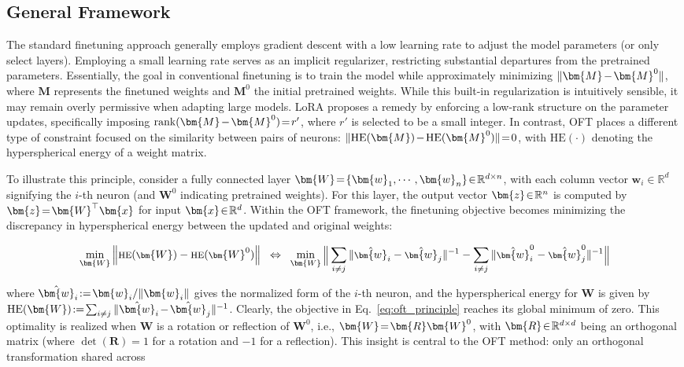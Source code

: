 \subsection{General Framework}

The standard finetuning approach generally employs gradient descent with a low learning rate to adjust the model parameters (or only select layers). Employing a small learning rate serves as an implicit regularizer, restricting substantial departures from the pretrained parameters. Essentially, the goal in conventional finetuning is to train the model while approximately minimizing $\thickmuskip=2mu \medmuskip=2mu \| \bm{M} - \bm{M}^0\|$, where $\bm{M}$ represents the finetuned weights and $\bm{M}^0$ the initial pretrained weights. While this built-in regularization is intuitively sensible, it may remain overly permissive when adapting large models. LoRA proposes a remedy by enforcing a low-rank structure on the parameter updates, specifically imposing $\thickmuskip=2mu \medmuskip=2mu \text{rank}(\bm{M} - \bm{M}^0)=r'$, where $r'$ is selected to be a small integer. In contrast, OFT places a different type of constraint focused on the similarity between pairs of neurons: $\thickmuskip=2mu \medmuskip=2mu \| \text{HE}(\bm{M})-\text{HE}(\bm{M}^0) \|=0$, with $\text{HE}(\cdot)$ denoting the hyperspherical energy of a weight matrix.

To illustrate this principle, consider a fully connected layer $\thickmuskip=2mu \medmuskip=2mu \bm{W}=\{\bm{w}_1,\cdots,\bm{w}_n\}\in\mathbb{R}^{d\times n}$, with each column vector $\bm{w}_i\in\mathbb{R}^{d}$ signifying the $i$-th neuron (and $\bm{W}^0$ indicating pretrained weights). For this layer, the output vector $\thickmuskip=2mu \medmuskip=2mu \bm{z}\in\mathbb{R}^n$ is computed by $\thickmuskip=2mu \medmuskip=2mu \bm{z}=\bm{W}^\top\bm{x}$ for input $\thickmuskip=2mu \medmuskip=2mu \bm{x}\in\mathbb{R}^d$. Within the OFT framework, the finetuning objective becomes minimizing the discrepancy in hyperspherical energy between the updated and original weights:

\begin{equation}\label{eq:oft_principle}
\footnotesize
\min_{\bm{W}} \left\| \text{HE}(\bm{W})-\text{HE}(\bm{W}^0)\right\|~~\Leftrightarrow~~\min_{\bm{W}} \bigg{\|} \sum_{i\neq j} \|\hat{\bm{w}}_i-\hat{\bm{w}}_j\|^{-1}-\sum_{i\neq j} \|\hat{\bm{w}}^0_i-\hat{\bm{w}}^0_j\|^{-1}\bigg{\|}
\end{equation}

where $\thickmuskip=2mu \medmuskip=2mu \hat{\bm{w}}_i:=\bm{w}_i/\|\bm{w}_i\|$ gives the normalized form of the $i$-th neuron, and the hyperspherical energy for $\bm{W}$ is given by $\thickmuskip=2mu \medmuskip=2mu \text{HE}(\bm{W}):= \sum_{i\neq j} \|\hat{\bm{w}}_i-\hat{\bm{w}}_j\|^{-1}$. Clearly, the objective in Eq.~\eqref{eq:oft_principle} reaches its global minimum of zero. This optimality is realized when $\bm{W}$ is a rotation or reflection of $\bm{W}^0$, i.e., $\thickmuskip=2mu \medmuskip=2mu \bm{W}=\bm{R}\bm{W}^0$, with $\thickmuskip=2mu \medmuskip=2mu \bm{R}\in\mathbb{R}^{d\times d}$ being an orthogonal matrix (where $\det(\bm{R})=1$ for a rotation and $-1$ for a reflection). This insight is central to the OFT method: only an orthogonal transformation shared across

